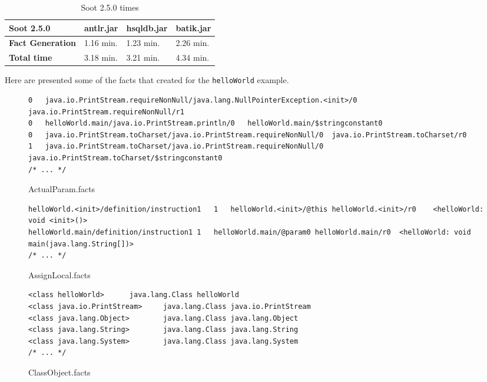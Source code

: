 \documentclass{dithesis}
\begin{document}
        \begin{table}[H]
            \centering
                \begin{tabular}{llll}
                \hline
                \textbf{Soot 2.5.0}      & \textbf{antlr.jar} & \textbf{hsqldb.jar} & \textbf{batik.jar} \\ \hline
                \textbf{Fact Generation} & 1.16 min.          & 1.23 min.           & 2.26 min.          \\
                \textbf{Total time}      & 3.18 min.          & 3.21 min.           & 4.34 min.          \\ \hline
                \end{tabular}
                \newline
            \caption{Soot 2.5.0 times}
        \end{table}

    	Here are presented some of the facts that created for the \texttt{helloWorld} example.
    	\begin{figure}[H]
\begin{lstlisting}
0   java.io.PrintStream.requireNonNull/java.lang.NullPointerException.<init>/0  java.io.PrintStream.requireNonNull/r1
0   helloWorld.main/java.io.PrintStream.println/0   helloWorld.main/$stringconstant0
0   java.io.PrintStream.toCharset/java.io.PrintStream.requireNonNull/0  java.io.PrintStream.toCharset/r0
1   java.io.PrintStream.toCharset/java.io.PrintStream.requireNonNull/0  java.io.PrintStream.toCharset/$stringconstant0
/* ... */
\end{lstlisting}
\caption{ActualParam.facts}
        \end{figure}



        \begin{figure}[H]
\begin{lstlisting}
helloWorld.<init>/definition/instruction1   1   helloWorld.<init>/@this helloWorld.<init>/r0    <helloWorld: void <init>()>
helloWorld.main/definition/instruction1 1   helloWorld.main/@param0 helloWorld.main/r0  <helloWorld: void main(java.lang.String[])>
/* ... */
\end{lstlisting}
\caption{AssignLocal.facts}
        \end{figure}

        

        \begin{figure}[H]
\begin{lstlisting}
<class helloWorld>      java.lang.Class helloWorld
<class java.io.PrintStream>     java.lang.Class java.io.PrintStream
<class java.lang.Object>        java.lang.Class java.lang.Object
<class java.lang.String>        java.lang.Class java.lang.String
<class java.lang.System>        java.lang.Class java.lang.System
/* ... */
\end{lstlisting}
\caption{ClassObject.facts}
        \end{figure}
\end{document}
